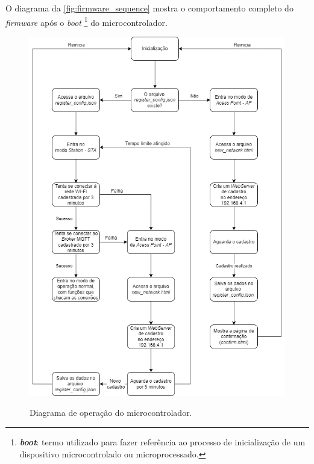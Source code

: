  O diagrama da \autoref{fig:firmware_sequence} mostra o comportamento completo do \textit{firmware} após o \textit{boot} \footnote{\textbf{\textit{boot}}: termo utilizado para fazer referência ao processo de inicialização de um dispositivo microcontrolado ou microprocessado.} do microcontrolador.

\begin{figure}[H]
	\centering
	\caption{Diagrama de operação do microcontrolador.}
	\includegraphics[width=1\textwidth]{figuras/firmware_sequence.png}
	\label{fig:firmware_sequence}
\end{figure}


